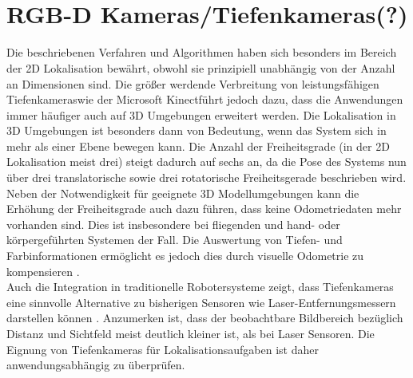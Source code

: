 \\


\\


\section{RGB-D Kameras/Tiefenkameras(?)}
Die beschriebenen Verfahren und Algorithmen haben sich besonders im Bereich der 2D Lokalisation bewährt, obwohl sie prinzipiell unabhängig von der Anzahl an Dimensionen sind. Die größer werdende Verbreitung von \red[bezahlbaren] leistungsfähigen Tiefenkameras wie der Microsoft Kinect\red[Tm] führt jedoch dazu, dass die Anwendungen immer häufiger auch auf 3D Umgebungen erweitert werden. Die Lokalisation in 3D Umgebungen ist besonders dann von Bedeutung, wenn das System sich in mehr als einer Ebene bewegen kann. Die Anzahl der Freiheitsgrade (in der 2D Lokalisation meist drei) steigt dadurch auf sechs an, da die Pose des Systems nun über drei translatorische sowie drei rotatorische Freiheitsgerade beschrieben wird. Neben der Notwendigkeit für geeignete 3D Modellumgebungen kann die Erhöhung der Freiheitsgrade auch dazu führen, dass keine Odometriedaten mehr vorhanden sind. Dies ist insbesondere bei fliegenden \cite{Huang2011} und hand- oder körpergeführten Systemen \cite{Fallon2012} der Fall. Die Auswertung von Tiefen- und Farbinformationen ermöglicht es jedoch dies durch visuelle Odometrie zu kompensieren \cite{Whelan2013robust}.\\
Auch die Integration in traditionelle Robotersysteme zeigt, dass Tiefenkameras eine sinnvolle Alternative zu bisherigen Sensoren wie Laser-Entfernungsmessern darstellen können \cite{Cunha2011} \cite{Eriksson2012}. Anzumerken ist, dass der beobachtbare Bildbereich bezüglich Distanz und Sichtfeld meist deutlich kleiner ist, als bei Laser Sensoren. Die Eignung von Tiefenkameras für Lokalisationsaufgaben ist daher anwendungsabhängig zu überprüfen.\\

